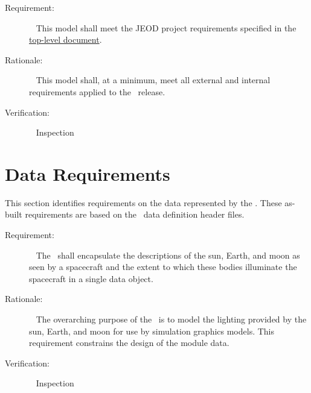 \label{reqt:toplevel}
\begin{description}
\item[Requirement:]\ \newline
  This model shall meet the JEOD project requirements specified in
  the \JEODid\
  \hyperref{file:\JEODHOME/docs/JEOD.pdf}{part1}{reqt}{ top-level
  document}.
\item[Rationale:]\ \newline
  This model shall, at a minimum,  meet all external and internal requirements
  applied to the \JEODid\ release.
\item[Verification:]\ \newline
     Inspection
\end{description}

%
%
%
%
%

\section{Data Requirements}\label{sec:data_reqts}
This section identifies requirements on the data represented by the \earthlightingDesc.
These as-built requirements are based on the \earthlightingDesc\ data definition header
files.

\label{reqt:data_vehicle_encapsulation}
\begin{description}
  \item[Requirement:]\ \newline
    The \earthlightingDesc\ shall encapsulate the
    descriptions of the sun, Earth, and moon as seen by a spacecraft
    and the extent to which these bodies illuminate the spacecraft
    in a single data object.

  \item[Rationale:]\ \newline
    The overarching purpose  of the \earthlightingDesc\
    is to model the lighting provided by the sun, Earth, and moon
    for use by simulation graphics models.
    This requirement constrains the design of the module data.

  \item[Verification:]\ \newline
    Inspection
\end{description}

